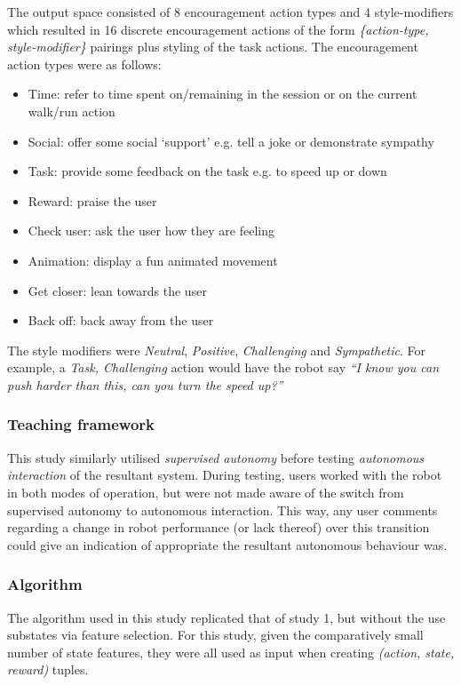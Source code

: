 \documentclass[manuscript, review, anonymous]{acmart}
\begin{document}
The output space consisted of 8 encouragement action types and 4 style-modifiers which resulted in 
16 discrete encouragement actions of the form \textit{\{action-type, style-modifier\}} pairings plus styling 
of the task actions. The encouragement action types were as follows:
\begin{itemize}
    \item Time: refer to time spent on/remaining in the session or on the current walk/run action
    \item Social: offer some social `support' e.g. tell a joke or demonstrate sympathy
    \item Task: provide some feedback on the task e.g. to speed up or down
    \item Reward: praise the user
    \item Check user: ask the user how they are feeling
    \item Animation: display a fun animated movement
    \item Get closer: lean towards the user
    \item Back off: back away from the user 
\end{itemize}

The style modifiers were \textit{Neutral}, \textit{Positive}, \textit{Challenging} and \textit{Sympathetic}. For example, a \textit{Task, Challenging} action would have the robot say \textit{``I know you can push harder than this, can you turn the speed up?''}

\subsubsection{Teaching framework}
This study similarly utilised \textit{supervised autonomy} before testing \textit{autonomous interaction} of the resultant system. During testing,
users worked with the robot in both modes of operation, but were not made aware of the switch
from supervised autonomy to autonomous interaction. This way, any user comments
regarding a change in robot performance (or lack thereof) over this transition could give an
indication of appropriate the resultant autonomous behaviour was. 

\subsubsection{Algorithm}
The algorithm used in this study replicated that of study 1, but without the use  
substates via feature selection. For this study, given the comparatively small number of state features, they
were all used as input when creating \textit{(action, state, reward)} tuples. 
\end{document}
